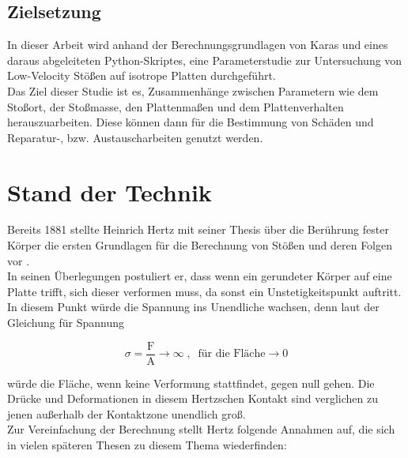 \section{Zielsetzung}
In dieser Arbeit wird anhand der Berechnungsgrundlagen von Karas und eines
daraus abgeleiteten Python-Skriptes, eine Parameterstudie zur Untersuchung von
Low-Velocity Stößen auf isotrope Platten durchgeführt. \\
Das Ziel dieser Studie ist es, Zusammenhänge zwischen Parametern wie dem Stoßort,
der Stoßmasse, den Plattenmaßen und dem Plattenverhalten herauszuarbeiten. Diese
können dann für die Bestimmung von Schäden und Reparatur-, bzw.
Austauscharbeiten genutzt werden.\\

\chapter{Stand der Technik}

Bereits 1881 stellte Heinrich Hertz mit seiner Thesis über die Berührung fester
Körper die ersten Grundlagen für die Berechnung von Stößen und deren Folgen vor
\cite{Hertz.1881}. \\
In seinen Überlegungen postuliert er, dass wenn ein gerundeter Körper auf eine
Platte trifft, sich dieser verformen muss, da sonst ein Unstetigkeitspunkt
auftritt. In diesem Punkt würde die Spannung ins Unendliche wachsen, denn laut
der Gleichung für Spannung 

\begin{equation}
\label{form:Druck}
\sigma = \frac{\mbox{F}}{\mbox{A}} \rightarrow \infty \; , \; \; \mbox{für die Fläche} \rightarrow 0
\end{equation}

würde die Fläche, wenn keine Verformung stattfindet, gegen null gehen. Die Drücke
und Deformationen in diesem Hertzschen Kontakt sind verglichen zu jenen
außerhalb der Kontaktzone unendlich groß. \\
Zur Vereinfachung der Berechnung stellt Hertz folgende Annahmen auf, die sich in
vielen späteren Thesen zu diesem Thema wiederfinden:

